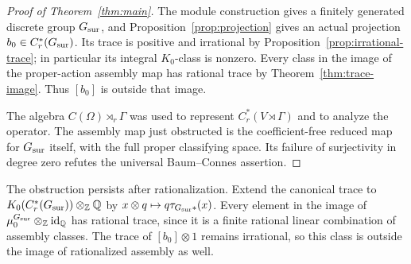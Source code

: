 \begin{proof}[Proof of Theorem~\ref{thm:main}]
The module construction gives a finitely generated discrete group
\(G_{\mathrm{sur}}\), and Proposition~\ref{prop:projection} gives an actual projection
\(b_0\in C_r^*(G_{\mathrm{sur}})\). Its trace is positive and irrational by
Proposition~\ref{prop:irrational-trace}; in particular its integral
\(K_0\)-class is nonzero. Every class in the image of the proper-action
assembly map has rational trace by Theorem~\ref{thm:trace-image}. Thus
\([b_0]\) is outside that image.

The algebra \(C(\Omega)\rtimes_r\Gamma\) was used to represent
\(C_r^*(V\rtimes\Gamma)\) and to analyze the operator. The assembly map
just obstructed is the coefficient-free reduced map for \(G_{\mathrm{sur}}\) itself,
with the full proper classifying space. Its failure of surjectivity in
degree zero refutes the universal Baum--Connes assertion.
\end{proof}

The obstruction persists after rationalization. Extend the canonical
trace to \(K_0(C_r^*(G_{\mathrm{sur}}))\otimes_{\mathbb Z}\mathbb Q\) by
\(x\otimes q\mapsto q\tau_{G_{\mathrm{sur}}*}(x)\). Every element in the image
of \(\mu_0^{G_{\mathrm{sur}}}\otimes_{\mathbb Z}\operatorname{id}_{\mathbb Q}\) has rational
trace, since it is a finite rational linear combination of assembly
classes. The trace of \([b_0]\otimes1\) remains irrational, so this class
is outside the image of rationalized assembly as well.
